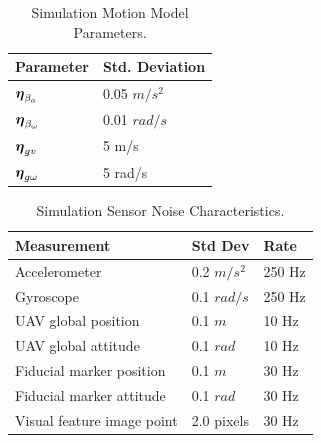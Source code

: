 \begin{table}[h!]
  \begin{center}
    \caption{Simulation Motion Model Parameters.}
    \label{tab:sim_process_noises}
    \begin{tabular}{l|l}
      \textbf{Parameter} & \textbf{Std. Deviation} \\
      \hline
      $\boldsymbol{\mathrm{\eta}}_{\beta_a}$ & 0.05 $m/s^2$ \\
      $\boldsymbol{\mathrm{\eta}}_{\beta_\omega}$ & 0.01 $rad/s$ \\
      $\boldsymbol{\mathrm{\eta}}_{gv}$ & 5 m/s \\
      $\boldsymbol{\mathrm{\eta}}_{g\omega}$ & 5 rad/s \\
    \end{tabular}
  \end{center}
\end{table}

\begin{table}[h!]
  \begin{center}
    \caption{Simulation Sensor Noise Characteristics.}
    \label{tab:sim_meas_noise}
    \begin{tabular}{l|l|l}
      \textbf{Measurement} & \textbf{Std Dev} & \textbf{Rate} \\
      \hline
      Accelerometer & 0.2 $m/s^2$ & 250 Hz \\
      Gyroscope & 0.1 $rad/s$ & 250 Hz \\
      UAV global position & 0.1 $m$ & 10 Hz \\
      UAV global attitude & 0.1 $rad$ & 10 Hz \\
      Fiducial marker position & 0.1 $m$ & 30 Hz \\
      Fiducial marker attitude & 0.1 $rad$ & 30 Hz \\
      Visual feature image point & 2.0 pixels & 30 Hz \\
    \end{tabular}
  \end{center}
\end{table}

